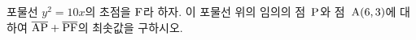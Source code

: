 포물선 $y^2=10x$의 초점을 $\mathrm{F}$라 하자. 이 포물선 위의 임의의 점~$\mathrm{P}$와 점~$\mathrm{A}(6{,}\mkern3mu\mathopen{}3)$에 대하여 $\overline{\mathrm{AP}}+\overline{\mathrm{PF}}$의 최솟값을 구하시오.
